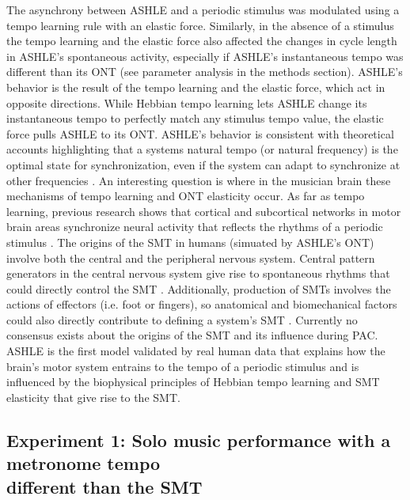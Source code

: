 \documentclass{report}
\begin{document}
The asynchrony between ASHLE and a periodic stimulus was modulated using a tempo learning rule with an elastic force. Similarly, in the absence of a stimulus the tempo learning and the elastic force also affected the changes in cycle length in ASHLE's spontaneous activity, especially if ASHLE's instantaneous tempo was different than its ONT (see parameter analysis in the methods section). ASHLE's behavior is the result of the tempo learning and the elastic force, which act in opposite directions. While Hebbian tempo learning lets ASHLE change its instantaneous tempo to perfectly match any stimulus tempo value, the elastic force pulls ASHLE to its ONT. ASHLE's behavior is consistent with theoretical accounts highlighting that a systems natural tempo (or natural frequency) is the optimal state for synchronization, even if the system can adapt to synchronize at other frequencies \cite{von1937nature, haken1985theoretical, kelso1997relative, scheurich2018tapping}. An interesting question is where in the musician brain these mechanisms of tempo learning and ONT elasticity occur. As far as tempo learning, previous research shows that cortical and subcortical networks in motor brain areas synchronize neural activity that reflects the rhythms of a periodic stimulus \cite{large2015neural, chen2008moving, grahn2009feeling, fujioka2012internalized}. The origins of the SMT in humans (simuated by ASHLE's ONT) involve both the central and the peripheral nervous system. Central pattern generators in the central nervous system give rise to spontaneous rhythms that could directly control the SMT \cite{latash1992virtual}. Additionally, production of SMTs involves the actions of effectors (i.e. foot or fingers), so anatomical and biomechanical factors could also directly contribute to defining a system's SMT \cite{goodman2000advantages}. Currently no consensus exists about the origins of the SMT and its influence during PAC. ASHLE is the first model validated by real human data that explains how the brain's motor system entrains to the tempo of a periodic stimulus and is influenced by the biophysical principles of Hebbian tempo learning and SMT elasticity that give rise to the SMT.

\subsection{Experiment 1: Solo music performance with a metronome tempo \\ different than the SMT}
\end{document}
